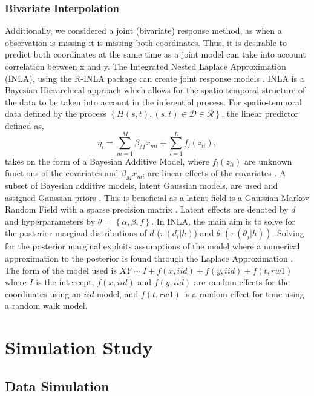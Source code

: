 \documentclass[12pt]{article}
\begin{document}
\hypertarget{bivariate-interpolation}{%
\subsubsection{Bivariate Interpolation}\label{bivariate-interpolation}}

Additionally, we considered a joint (bivariate) response method, as when
a observation is missing it is missing both coordinates. Thus, it is
desirable to predict both coordinates at the same time as a joint model
can take into account correlation between x and y. The Integrated Nested
Laplace Approximation (INLA), using the R-INLA package can create joint
response models \citep[\citet{rue_review_2017}]{rue_inla_2009}. INLA is
a Bayesian Hierarchical approach which allows for the spatio-temporal
structure of the data to be taken into account in the inferential
process. For spatio-temporal data defined by the process
\(\left\{H(s,t), (s,t) \in \mathcal{D} \in \mathcal{R}\right\}\), the
linear predictor defined as,
\[\eta_{i} = \sum^{M}_{m=1}\beta_{M}x_{mi} + \sum^{L}_{l=1}f_{l}(z_{li}),\]
takes on the form of a Bayesian Additive Model, where \(f_{l}(z_{li})\)
are unknown functions of the covariates and \(\beta_{M}x_{mi}\) are
linear effects of the covariates \citep{BLANGIARDO201333}. A subset of
Bayesian additive models, latent Gaussian models, are used and assigned
Gaussian priors \citep{MORAGA2021100440}. This is beneficial as a latent
field is a Gaussian Markov Random Field with a sparse precision matrix
\citep{BLANGIARDO201333}. Latent effects are denoted by \(d\) and
hyperparameters by \(\theta\) = \(\left\{\alpha, \beta, f\right\}\). In
INLA, the main aim is to solve for the posterior marginal distributions
of \(d\) (\(\pi(d_i|h)\)) and \(\theta\) \((\pi(\theta_j|h))\). Solving
for the posterior marginal exploits assumptions of the model where a
numerical approximation to the posterior is found through the Laplace
Approximation \citep{rue_inla_2009}. The form of the model used is
\(XY \sim I + f(x,iid) + f(y,iid) + f(t, rw1)\) where \(I\) is the
intercept, \(f(x,iid)\) and \(f(y,iid)\) are random effects for the
coordinates using an \(iid\) model, and \(f(t, rw1)\) is a random effect
for time using a random walk model.

\hypertarget{simulation}{%
\section{Simulation Study}\label{simulation}}

\hypertarget{data-simulation}{%
\subsection{Data Simulation}\label{data-simulation}}
\end{document}
